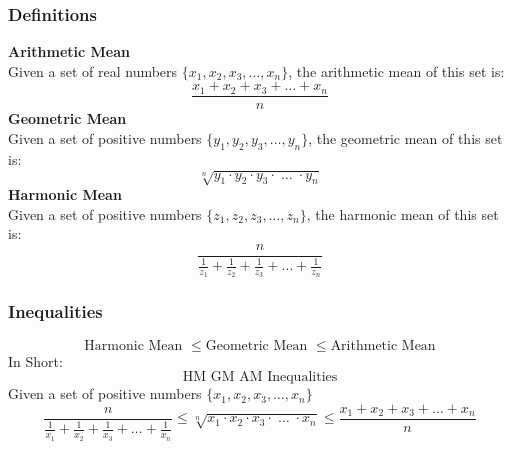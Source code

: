 \subsubsection{Definitions}
\textbf{Arithmetic Mean}\\
Given a set of real numbers $\{x_1,x_2,x_3,\ldots,x_n\}$, the arithmetic mean of this set is:\\
\[
    \frac{x_1+x_2+x_3+\ldots+x_n}{n}
\]
\textbf{Geometric Mean}\\
Given a set of positive numbers $\{y_1,y_2,y_3,\ldots,y_n\}$, the geometric mean of this set is:\\
\[
    \sqrt[n]{y_1\cdot y_2\cdot y_3\cdot \;\ldots\; \cdot  y_n}
\]
\textbf{Harmonic Mean}\\
Given a set of positive numbers $\{z_1,z_2,z_3,\ldots,z_n\}$, the harmonic mean of this set is:\\
\[
    \frac{n}{\frac{1}{z_1}+\frac{1}{z_2}+\frac{1}{z_3}+\ldots+\frac{1}{z_n}}
\]
\subsubsection{Inequalities}
\[
    \text{Harmonic Mean } \leq \text{Geometric Mean } \leq \text{Arithmetic Mean}
\]
In Short:\\
\[
    \text{HM GM AM Inequalities}
\]
Given a set of positive numbers $\{x_1,x_2,x_3,\ldots,x_n\}$\\
\[
    \frac{n}{\frac{1}{x_1}+\frac{1}{x_2}+\frac{1}{x_3}+\ldots+\frac{1}{x_n}} \leq \sqrt[n]{x_1\cdot x_2\cdot x_3\cdot\; \ldots\; \cdot x_n} \leq \frac{x_1+x_2+x_3+\ldots+x_n}{n}
\]
